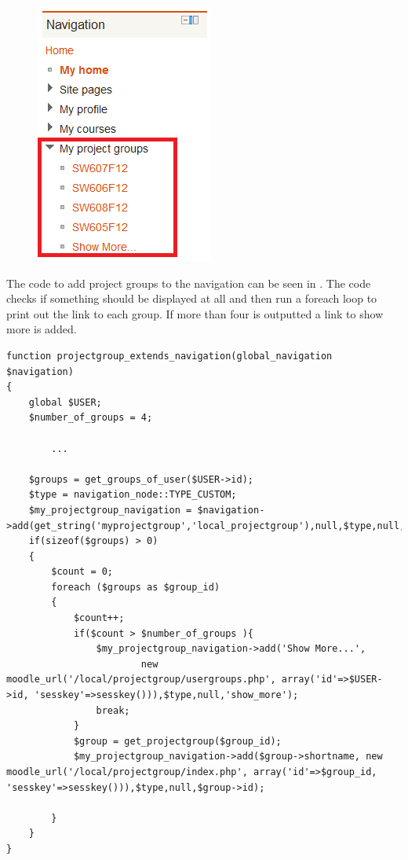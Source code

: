 \begin{figure}
	\centering
		\includegraphics[scale=0.7]{images/moodlenavigationblock.png}
	\label{fig:moodlenavigationblock}
\end{figure}
The code to add project groups to the navigation can be seen in . The code checks if something should be displayed at all and then run a foreach loop to print out the link to each group. 
If more than four is outputted a link to show more is added. 


\begin{lstlisting}[style=phpCode, caption=\myCaption{The code for extending the navigation}, label=moodlecodeextendingnavigation]
function projectgroup_extends_navigation(global_navigation $navigation) 
{
    global $USER;
    $number_of_groups = 4;
    
		...
    
    $groups = get_groups_of_user($USER->id);
    $type = navigation_node::TYPE_CUSTOM;
    $my_projectgroup_navigation = $navigation->add(get_string('myprojectgroup','local_projectgroup'),null,$type,null,'myprojectgroup');
    if(sizeof($groups) > 0)
    {
        $count = 0;
        foreach ($groups as $group_id) 
        {
            $count++;
            if($count > $number_of_groups ){
                $my_projectgroup_navigation->add('Show More...', 
                        new moodle_url('/local/projectgroup/usergroups.php', array('id'=>$USER->id, 'sesskey'=>sesskey())),$type,null,'show_more');
                break;
            }
            $group = get_projectgroup($group_id);
            $my_projectgroup_navigation->add($group->shortname, new moodle_url('/local/projectgroup/index.php', array('id'=>$group_id, 'sesskey'=>sesskey())),$type,null,$group->id);
            
        }
    }
}
\end{lstlisting}




















